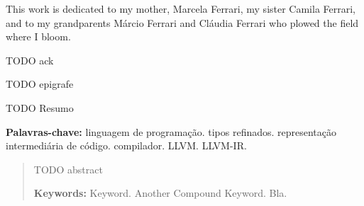 \documentclass[
  oneside,
  english,
  coorientadorbanca,
  embeddedlogo,
  noabntexcite
]{ufsc-thesis-rn46-2019}
\begin{document}

\pretextual{}
\imprimircapa{}
\imprimirfolhaderosto*
\protect{}%
\imprimirfolhadecertificacao{}



\begin{dedicatoria}
  This work is dedicated to my mother, Marcela Ferrari, my sister Camila Ferrari, and to my grandparents Márcio Ferrari and Cláudia Ferrari who plowed the field where I bloom.
\end{dedicatoria}

\begin{agradecimentos}
  TODO ack
\end{agradecimentos}

\begin{epigrafe}
  TODO epigrafe
\end{epigrafe}

\begin{resumo}[Resumo]
  TODO Resumo

  \vspace{\baselineskip}
  \textbf{Palavras-chave:} linguagem de programação\@. tipos refinados\@. representação intermediária de código\@. compilador\@. LLVM\@. LLVM-IR\@.
\end{resumo}

\begin{abstract}
  TODO abstract

  \vspace{\baselineskip}
  \textbf{Keywords:} Keyword. Another Compound Keyword. Bla.
\end{abstract}

\listoffigures*  %
\end{document}

